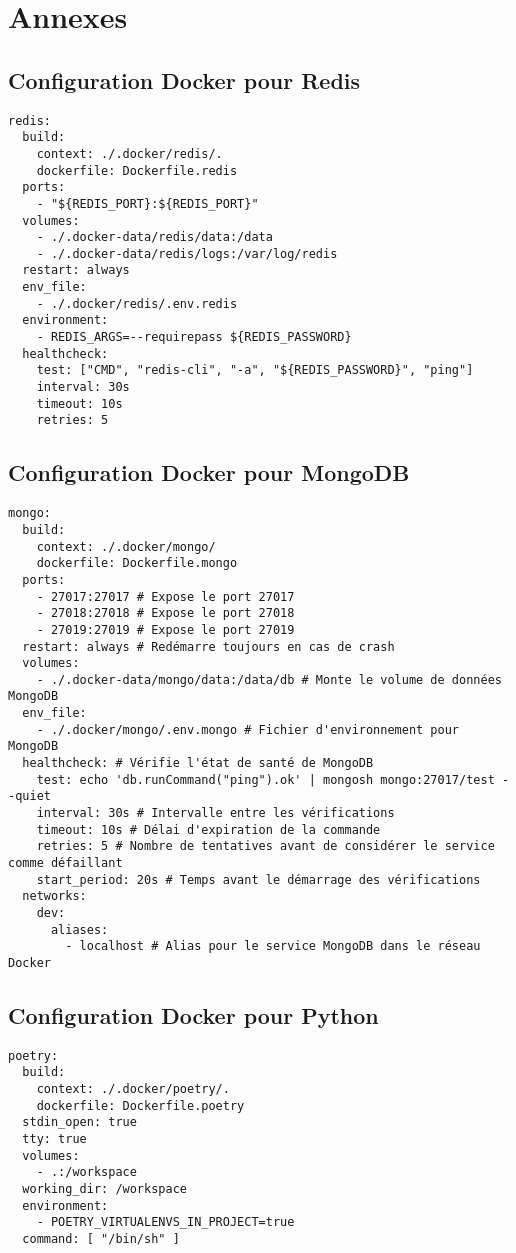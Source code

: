 \appendix
\chapter{Annexes}

\section{Configuration Docker pour Redis}
\label{ann:docker_redis}
\begin{verbatim}
redis:
  build:
    context: ./.docker/redis/.
    dockerfile: Dockerfile.redis
  ports:
    - "${REDIS_PORT}:${REDIS_PORT}"
  volumes:
    - ./.docker-data/redis/data:/data
    - ./.docker-data/redis/logs:/var/log/redis
  restart: always
  env_file:
    - ./.docker/redis/.env.redis
  environment:
    - REDIS_ARGS=--requirepass ${REDIS_PASSWORD}
  healthcheck:
    test: ["CMD", "redis-cli", "-a", "${REDIS_PASSWORD}", "ping"]
    interval: 30s
    timeout: 10s
    retries: 5
\end{verbatim}

\section{Configuration Docker pour MongoDB}
\label{ann:docker_mongo}
\begin{verbatim}
mongo:
  build:
    context: ./.docker/mongo/
    dockerfile: Dockerfile.mongo
  ports:
    - 27017:27017 # Expose le port 27017
    - 27018:27018 # Expose le port 27018
    - 27019:27019 # Expose le port 27019
  restart: always # Redémarre toujours en cas de crash
  volumes:
    - ./.docker-data/mongo/data:/data/db # Monte le volume de données MongoDB
  env_file:
    - ./.docker/mongo/.env.mongo # Fichier d'environnement pour MongoDB
  healthcheck: # Vérifie l'état de santé de MongoDB
    test: echo 'db.runCommand("ping").ok' | mongosh mongo:27017/test --quiet
    interval: 30s # Intervalle entre les vérifications
    timeout: 10s # Délai d'expiration de la commande
    retries: 5 # Nombre de tentatives avant de considérer le service comme défaillant
    start_period: 20s # Temps avant le démarrage des vérifications
  networks:
    dev:
      aliases:
        - localhost # Alias pour le service MongoDB dans le réseau Docker
\end{verbatim}

\section{Configuration Docker pour Python}
\label{ann:docker_poetry}
\begin{verbatim}
poetry:
  build:
    context: ./.docker/poetry/.
    dockerfile: Dockerfile.poetry
  stdin_open: true
  tty: true
  volumes:
    - .:/workspace
  working_dir: /workspace
  environment:
    - POETRY_VIRTUALENVS_IN_PROJECT=true
  command: [ "/bin/sh" ]
\end{verbatim}

